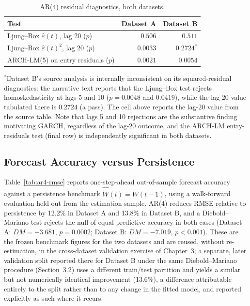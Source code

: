 \documentclass[11pt, a4paper, twoside]{article}
\begin{document}
\begin{table}[htbp]
\centering
\caption{AR(4) residual diagnostics, both datasets.}
\label{tab:ar4-diag}
\begin{tabular}{l r r}
\toprule
\textbf{Test} & \textbf{Dataset A} & \textbf{Dataset B} \\
\midrule
Ljung--Box $\hat\varepsilon(t)$, lag 20 ($p$) & $0.506$ & $0.511$ \\
Ljung--Box $\hat\varepsilon(t)^2$, lag 20 ($p$) & $0.0033$ & $0.2724^{\ast}$ \\
ARCH-LM(5) on entry residuals ($p$) & $0.0021$ & $0.0054$ \\
\bottomrule
\end{tabular}
\vspace{2pt}
{\footnotesize $^{\ast}$Dataset B's source analysis is internally inconsistent on its squared-residual diagnostics: the narrative text reports that the Ljung--Box test rejects homoskedasticity at lags 5 and 10 ($p = 0.0048$ and $0.0419$), while the lag-20 value tabulated there is $0.2724$ (a pass). The cell above reports the lag-20 value from the source table. Note that lags 5 and 10 rejections are the substantive finding motivating GARCH, regardless of the lag-20 outcome, and the ARCH-LM entry-residuals test (final row) is independently significant in both datasets.}
\end{table}

\subsection{Forecast Accuracy versus Persistence}
\label{sec:phase2-rmse}

Table~\ref{tab:ar4-rmse} reports one-step-ahead out-of-sample forecast accuracy against a persistence benchmark $\hat{\widetilde W}(t) = \widetilde W(t-1)$, using a walk-forward evaluation held out from the estimation sample. AR(4) reduces RMSE relative to persistence by 12.2\% in Dataset A and 13.8\% in Dataset B, and a Diebold--Mariano test \citep{DieboldMariano1995} rejects the null of equal predictive accuracy in both cases (Dataset A: $DM = -3.681$, $p = 0.0002$; Dataset B: $DM = -7.019$, $p < 0.001$). These are the frozen benchmark figures for the two datasets and are reused, without re-estimation, in the cross-dataset validation exercise of Chapter~3; a separate, later validation split reported there for Dataset B under the same Diebold--Mariano procedure (Section~3.2) uses a different train/test partition and yields a similar but not numerically identical improvement (13.6\%), a difference attributable entirely to the split rather than to any change in the fitted model, and reported explicitly as such where it recurs.
\end{document}
